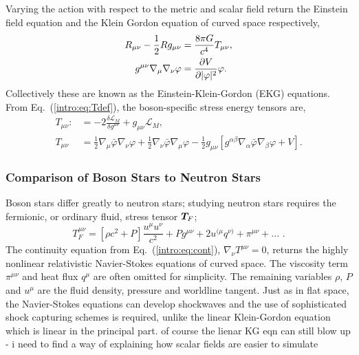 Varying the action with respect to the metric and scalar field return the Einstein field equation and the Klein Gordon equation of curved space respectively,
\begin{align} R_{\mu\nu} - \frac{1}{2}R g_{\mu\nu} &=  \frac{8\pi G}{c^4} T_{\mu\nu}  ,\\
g^{\mu\nu}\nabla_\mu\nabla_\nu \varphi &= \frac{\partial V}{\partial |\varphi|^2}\varphi .\label{boson:eq:KGeqn}\end{align}
Collectively these are known as the Einstein-Klein-Gordon (EKG) equations. From Eq.~(\ref{intro:eq:Tdef}), the boson-specific stress energy tensors are,
\begin{align}  
T_{\mu\nu} :&= -2\frac{\delta \mathcal{L}_{M}}{\delta g^{\mu\nu}}+g_{\mu\nu}\mathcal{L}_M, \\
T_{\mu\nu} &= \frac{1}{2}\nabla_{\mu}\bar{\varphi}\nabla_{\nu}\varphi+\frac{1}{2}\nabla_{\nu}\bar{\varphi}\nabla_{\mu}\varphi-\frac{1}{2}g_{\mu\nu}\left[g^{\alpha\beta}\nabla_\alpha\bar{\varphi}\nabla_\beta\varphi + V\right] \label{boson:eq:KGT}.
\end{align}
\subsubsection{Comparison of Boson Stars to Neutron Stars}
Boson stars differ greatly to neutron stars; studying neutron stars requires the fermionic, or ordinary fluid, stress tensor $\boldsymbol{T}_F$; 
\begin{equation} T^{\mu\nu}_F = \left[\rho c^2+ {P} \right]\frac{u^\mu u^\nu}{c^2} + P g^{\mu\nu} + 2u^{(\mu}q^{\nu)}+\pi^{\mu\nu}+ ...\,\,.\end{equation} 
The continuity equation from Eq.~(\ref{intro:eq:cont}), $\nabla_\nu T^{\mu\nu}=0 $, returns the highly nonlinear relativistic Navier-Stokes equations of curved space. The viscosity term $\pi^{\mu\nu}$ and heat flux $q^\mu$ are often omitted for simplicity. The remaining variables $\rho$, $P$ and $u^\mu$ are the fluid density, pressure and worldline tangent. Just as in flat space, the Navier-Stokes equations can develop shockwaves and the use of sophisticated shock capturing schemes is required, unlike the linear Klein-Gordon equation which is linear in the principal part. \color{gren} of course the lienar KG eqn can still blow up - i need to find a way of explaining how scalar fields are easier to simulate \color{black}


